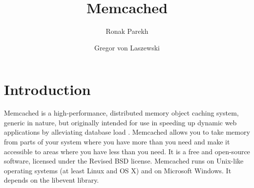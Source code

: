 \documentclass[9pt,twocolumn,twoside]{../../styles/osajnl}
\title{Memcached}
\author[1]{Ronak Parekh}
\author[2]{Gregor von Laszewski}
\affil[1]{School of Informatics and Computing, Bloomington, IN 47408, U.S.A.}
\begin{document}
\maketitle

\section{Introduction}
Memcached is a high-performance, distributed memory object caching
system, generic in nature, but originally intended for use in speeding
up dynamic web applications by alleviating database load
\cite{www-memcached}. Memcached allows you to take memory from parts
of your system where you have more than you need and make it
accessible to areas where you have less than you need. It is a free
and open-source software, licensed under the Revised BSD
\cite{www-bsd-wikipedia} license. Memcached runs on Unix-like
operating systems (at least Linux and OS X) and on Microsoft Windows.
It depends on the libevent library.
\end{document}
